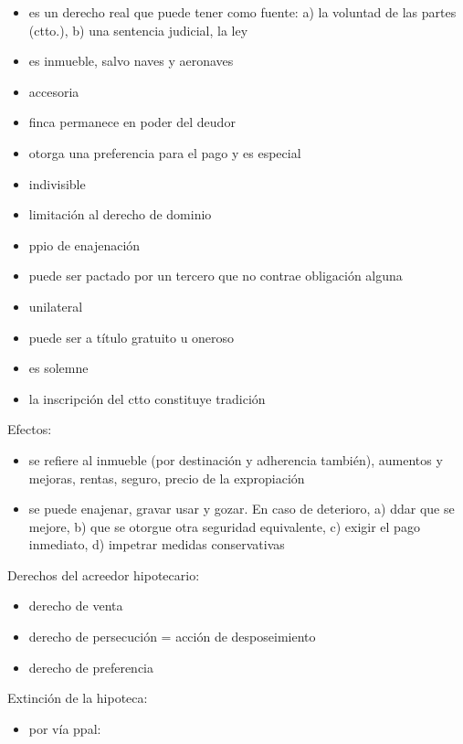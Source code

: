 \documentclass[]{article}
\providecommand{\tightlist}{%
  \setlength{\itemsep}{0pt}\setlength{\parskip}{0pt}}
\begin{document}
\begin{itemize}
  \begin{itemize}
  \tightlist
  \item
    es un derecho real que puede tener como fuente: a) la voluntad de
    las partes (ctto.), b) una sentencia judicial, la ley
  \item
    es inmueble, salvo naves y aeronaves
  \item
    accesoria
  \item
    finca permanece en poder del deudor
  \item
    otorga una preferencia para el pago y es especial
  \item
    indivisible
  \item
    limitación al derecho de dominio
  \item
    ppio de enajenación
  \item
    puede ser pactado por un tercero que no contrae obligación alguna
  \item
    unilateral
  \item
    puede ser a título gratuito u oneroso
  \item
    es solemne
  \item
    la inscripción del ctto constituye tradición
  \end{itemize}

  Efectos:

  \begin{itemize}
  \tightlist
  \item
    se refiere al inmueble (por destinación y adherencia también),
    aumentos y mejoras, rentas, seguro, precio de la expropiación
  \item
    se puede enajenar, gravar usar y gozar. En caso de deterioro, a)
    ddar que se mejore, b) que se otorgue otra seguridad equivalente, c)
    exigir el pago inmediato, d) impetrar medidas conservativas
  \end{itemize}

  Derechos del acreedor hipotecario:

  \begin{itemize}
  \tightlist
  \item
    derecho de venta
  \item
    derecho de persecución = acción de desposeimiento
  \item
    derecho de preferencia
  \end{itemize}

  Extinción de la hipoteca:

  \begin{itemize}
  \tightlist
  \item
    por vía ppal:


\end{itemize}
\end{itemize}
\end{document}
